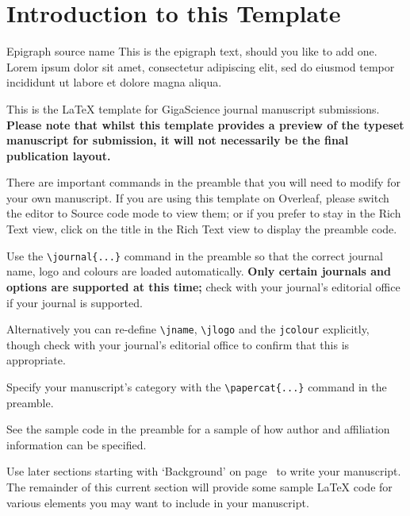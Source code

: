 \documentclass[a4paper,num-refs]{oup-contemporary}
\begin{document}
\section{Introduction to this Template}

\begin{epigraph}{Epigraph source name}
This is the epigraph text, should you like to add one. Lorem ipsum dolor sit amet, consectetur adipiscing elit, sed do eiusmod tempor incididunt ut labore et dolore magna aliqua.
\end{epigraph}

This is the \LaTeX{} template for GigaScience journal manuscript submissions. \textbf{Please note that whilst this template provides a preview of the typeset manuscript for submission, it will not necessarily be the final publication layout.}

There are important commands in the preamble that you will need to modify for your own manuscript. If you are using this template on Overleaf, please switch the editor to Source code mode to view them; or if you prefer to stay in the Rich Text view, click on the title in the Rich Text view to display the preamble code.

Use the \verb|\journal{...}| command in the preamble so that the correct journal name, logo and colours are loaded automatically. \textbf{Only certain journals and options are supported at this time;} check with your journal's editorial office if your journal is supported.

Alternatively you can re-define \verb|\jname|, \verb|\jlogo| and the \verb|jcolour| explicitly, though check with your journal's editorial office to confirm that this is appropriate.

Specify your manuscript's category with the \verb|\papercat{...}| command in the preamble.

See the sample code in the preamble for a sample of how author and affiliation information can be specified.

Use later sections starting with `Background' on page~\pageref{sec:background} to write your manuscript. The remainder of this current section will provide some sample \LaTeX{} code for various elements you may want to include in your manuscript.
\end{document}
